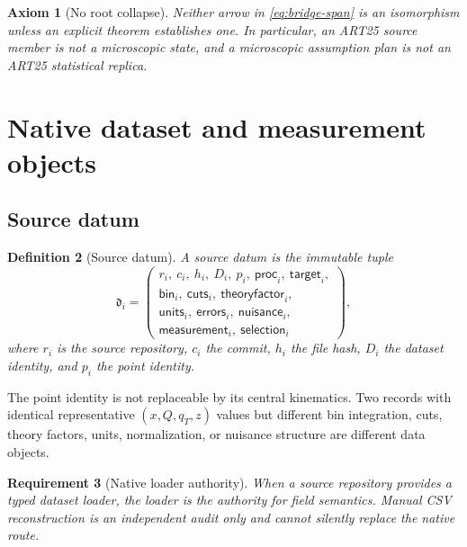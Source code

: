 \documentclass[11pt]{article}
\newtheorem{definition}{Definition}[section]
\newtheorem{axiom}[definition]{Axiom}
\newtheorem{requirement}[definition]{Requirement}
\begin{document}
\begin{axiom}[No root collapse]
Neither arrow in \cref{eq:bridge-span} is an isomorphism unless an explicit theorem establishes one.  In particular, an ART25 source member is not a microscopic state, and a microscopic assumption plan is not an ART25 statistical replica.
\end{axiom}

\section{Native dataset and measurement objects}
\label{sec:dataset-objects}

\subsection{Source datum}

\begin{definition}[Source datum]
A source datum is the immutable tuple
\begin{equation}
 \mathfrak d_i
 =
 \left(
 \begin{gathered}
 r_i,\ c_i,\ h_i,\ D_i,\ p_i,\ \mathsf{proc}_i,\ \mathsf{target}_i,\\
 \mathsf{bin}_i,\ \mathsf{cuts}_i,\ \mathsf{theoryfactor}_i,\\
 \mathsf{units}_i,\ \mathsf{errors}_i,\ \mathsf{nuisance}_i,\\
 \mathsf{measurement}_i,\ \mathsf{selection}_i
 \end{gathered}
 \right),
 \label{eq:source-datum}
\end{equation}
where \(r_i\) is the source repository, \(c_i\) the commit, \(h_i\) the file hash, \(D_i\) the dataset identity, and \(p_i\) the point identity.
\end{definition}

The point identity is not replaceable by its central kinematics.  Two records with identical representative \((x,Q,q_T,z)\) values but different bin integration, cuts, theory factors, units, normalization, or nuisance structure are different data objects.

\begin{requirement}[Native loader authority]
When a source repository provides a typed dataset loader, the loader is the authority for field semantics.  Manual CSV reconstruction is an independent audit only and cannot silently replace the native route.
\end{requirement}
\end{document}
